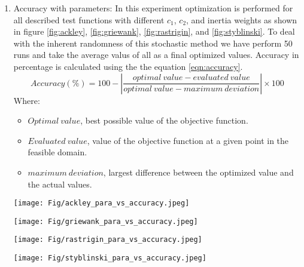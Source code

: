 \documentclass[paper,revised]{geophysics}
\begin{document}
\begin{enumerate}
	\item Accuracy with parameters: In this experiment optimization is performed for all described test functions with different \(c_1\), \(c_2\), and inertia weights as shown in figure \ref{fig:ackley}, \ref{fig:griewank}, \ref{fig:rastrigin}, and \ref{fig:styblinski}. To deal with the inherent randomness of this stochastic method we have perform 50 runs and take the average valus of all as a final optimized values. Accuracy in percentage is calculated using the the equation \ref{eqn:accuracy}.
	\begin{equation}
		Accuracy (\%) = 100 - \left| \frac{optimal \ value - evaluated \ value}{optimal \ value - maximum \ deviation} \right| \times 100
		\label{eqn:accuracy}
	\end{equation}
Where:
\begin{itemize}
	\item \(Optimal \  value\), best possible value of the objective function.
	\item \(Evaluated \ value\), value of the objective function at a given point in the feasible domain.
	\item \(maximum \ deviation\), largest difference between the optimized value and the actual values.
\end{itemize}
	\begin{sidewaysfigure}	
		\texttt{[image: Fig/ackley\_para\_vs\_accuracy.jpeg]}
		\caption{Optimization of the Ackley function with varying inertia weights, \(c_1\), and \(c_2\) coefficients.}
		\label{fig:ackley}
	\end{sidewaysfigure} 
	\begin{sidewaysfigure}	
		\texttt{[image: Fig/griewank\_para\_vs\_accuracy.jpeg]}
		\caption{Optimization of the Griewank function with varying inertia weights, \(c_1\), and \(c_2\) coefficients.}
		\label{fig:griewank}
	\end{sidewaysfigure} 
	\begin{sidewaysfigure}	
		\texttt{[image: Fig/rastrigin\_para\_vs\_accuracy.jpeg]}
		\caption{Optimization of the Rastrigin function with varying inertia weights, \(c_1\), and \(c_2\) coefficients.}
		\label{fig:rastrigin}
	\end{sidewaysfigure} 
	\begin{sidewaysfigure}	
		\texttt{[image: Fig/styblinski\_para\_vs\_accuracy.jpeg]}
		\caption{Optimization of the Styblinski-Tang function with varying inertia weights, \(c_1\), and \(c_2\) coefficients.}
		\label{fig:styblinski}
	\end{sidewaysfigure} 
\end{enumerate}
\end{document}
